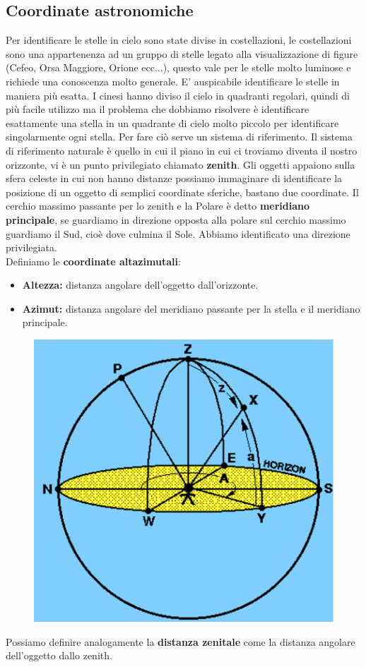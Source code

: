 \documentclass[a4paper,11pt]{article}
\begin{document}
\subsection{Coordinate astronomiche}
Per identificare le stelle in cielo sono state divise in costellazioni, le costellazioni sono una appartenenza ad un gruppo di stelle legato alla visualizzazione di figure (Cefeo, Orsa Maggiore, Orione ecc...), questo vale per le stelle molto luminose e richiede una conoscenza molto generale. E' auspicabile identificare le stelle in maniera più esatta. I cinesi hanno diviso il cielo in quadranti regolari, quindi di più facile utilizzo ma il problema che dobbiamo risolvere è identificare esattamente una stella in un quadrante di cielo molto piccolo per identificare singolarmente ogni stella. Per fare ciò serve un sistema di riferimento. Il sistema di riferimento naturale è quello in cui il piano in cui ci troviamo diventa il nostro orizzonte, vi è un punto privilegiato chiamato \textbf{zenith}. Gli oggetti appaiono sulla sfera celeste in cui non hanno distanze possiamo immaginare di identificare la posizione di un oggetto di semplici coordinate sferiche, bastano due coordinate. Il cerchio massimo passante per lo zenith e la Polare è detto \textbf{meridiano principale}, se guardiamo in direzione opposta alla polare sul cerchio massimo guardiamo il Sud, cioè dove culmina il Sole. Abbiamo identificato una direzione privilegiata.\\
Definiamo le \textbf{coordinate altazimutali}:
\begin{itemize}
    \item \textbf{Altezza:} distanza angolare dell'oggetto dall'orizzonte.
    \item \textbf{Azimut:} distanza angolare del meridiano passante per la stella e il meridiano principale.
\end{itemize}
\begin{figure}[ht]
    \centering
    \includegraphics[width=5 cm]{Coordinate altazimutali.png}
\end{figure}
Possiamo definire analogamente la \textbf{distanza zenitale} come la distanza angolare dell'oggetto dallo zenith.\\
\end{document}
